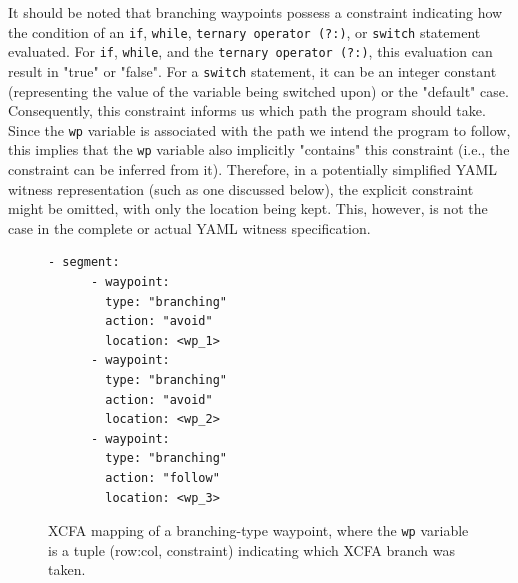 It should be noted that branching waypoints possess a constraint indicating how the condition of an \texttt{if}, \texttt{while}, 
\texttt{ternary operator (?:)}, or \texttt{switch} statement evaluated.
For \texttt{if}, \texttt{while}, and the \texttt{ternary operator (?:)}, this evaluation can result in "true" or "false".
For a \texttt{switch} statement, it can be an integer constant (representing the value of the variable being switched upon) or the "default" case.
Consequently, this constraint informs us which path the program should take.
Since the \texttt{wp} variable is associated with the path we intend the program to follow, this implies that the \texttt{wp}
variable also implicitly "contains" this constraint (i.e., the constraint can be inferred from it).
Therefore, in a potentially simplified YAML witness representation (such as one discussed below), the explicit constraint might 
be omitted, with only the location being kept. This, however, is not the case in the complete or actual YAML witness specification.


\begin{figure}[H]
  \centering
  \begin{minipage}[t]{0.35\textwidth}
    \begin{lstlisting}[style=c, columns=flexibl]
    - segment:
      - waypoint:
        type: "branching"
        action: "avoid"
        location: <wp_1>
      - waypoint:
        type: "branching"
        action: "avoid"
        location: <wp_2>
      - waypoint:
        type: "branching"
        action: "follow"
        location: <wp_3>
    \end{lstlisting}
    \end{minipage}
    \hspace{2cm}
  \caption{XCFA mapping of a branching-type waypoint, where the \texttt{wp} variable is a tuple (row:col, constraint)
  indicating which XCFA branch was taken.}
  \label{fig:combined}
\end{figure}

